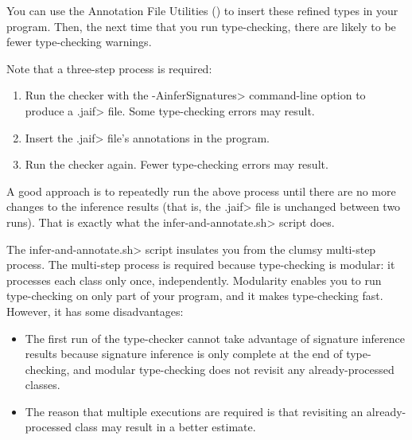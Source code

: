 You can use the Annotation File Utilities
() to
insert these refined types in your program.  Then, the next time that you
run type-checking, there are likely to be fewer type-checking warnings.

Note that a three-step process is required:
\begin{enumerate}
\item Run the checker with the \<-AinferSignatures> command-line option to
  produce a \<.jaif> file.  Some type-checking errors may result.
\item Insert the \<.jaif> file's annotations in the program.
\item Run the checker again.  Fewer type-checking errors may result.
\end{enumerate}
\noindent
A good approach is to repeatedly run the above process until there are no
more changes to the inference results (that is, the \<.jaif> file is
unchanged between two runs).  That is exactly what the
\<infer-and-annotate.sh> script does.

The \<infer-and-annotate.sh> script insulates you from the
clumsy multi-step process.  The multi-step process
is required because type-checking is modular:
it processes each class only once, independently.  Modularity enables you
to run type-checking on only part of your program, and
it makes type-checking fast.  However, it has some disadvantages:
\begin{itemize}
\item
  The first run of the type-checker cannot take advantage
  of signature inference results because signature inference is only complete at the
  end of type-checking, and modular type-checking does not revisit any
  already-processed classes.
\item
  The reason that multiple executions are required is that revisiting an
  already-processed class may result in a better estimate.
\end{itemize}



